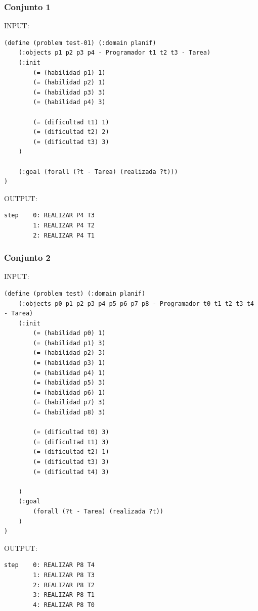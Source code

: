 \documentclass[12pt, titlepage]{article}
\begin{document}
\subsubsection*{Conjunto 1}

INPUT:
\begin{lstlisting}[language=PDDL]
(define (problem test-01) (:domain planif)
    (:objects p1 p2 p3 p4 - Programador t1 t2 t3 - Tarea)
    (:init
        (= (habilidad p1) 1)
        (= (habilidad p2) 1)
        (= (habilidad p3) 3)
        (= (habilidad p4) 3) 

        (= (dificultad t1) 1)
        (= (dificultad t2) 2)
        (= (dificultad t3) 3)        
    )

    (:goal (forall (?t - Tarea) (realizada ?t)))
)
\end{lstlisting}

OUTPUT:
\begin{lstlisting}
step    0: REALIZAR P4 T3
        1: REALIZAR P4 T2
        2: REALIZAR P4 T1
\end{lstlisting}

\subsubsection*{Conjunto 2}

INPUT:
\begin{lstlisting}[language=PDDL]
(define (problem test) (:domain planif)
	(:objects p0 p1 p2 p3 p4 p5 p6 p7 p8 - Programador t0 t1 t2 t3 t4 - Tarea)
	(:init
		(= (habilidad p0) 1)
		(= (habilidad p1) 3)
		(= (habilidad p2) 3)
		(= (habilidad p3) 1)
		(= (habilidad p4) 1)
		(= (habilidad p5) 3)
		(= (habilidad p6) 1)
		(= (habilidad p7) 3)
		(= (habilidad p8) 3)
		
		(= (dificultad t0) 3)
		(= (dificultad t1) 3)
		(= (dificultad t2) 1)
		(= (dificultad t3) 3)
		(= (dificultad t4) 3)
		
	)
	(:goal
		(forall (?t - Tarea) (realizada ?t))
	)
)
\end{lstlisting}

OUTPUT:
\begin{lstlisting}
step    0: REALIZAR P8 T4
        1: REALIZAR P8 T3
        2: REALIZAR P8 T2
        3: REALIZAR P8 T1
        4: REALIZAR P8 T0
\end{lstlisting}
\end{document}
